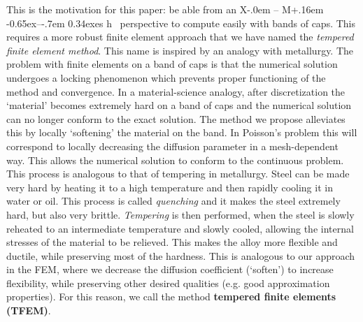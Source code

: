 \documentclass{article}
\makeatletter
\newcommand\xm{%
  X\kern-.0em%
  --%
   \hbox{M}\kern+.16em%
   \raise-0.65ex\hbox{--}\kern-.7em%
  \raise0.34ex\hbox{es}%
  \hbox{{h}}%
\@}
\theoremstyle{remark}
\makeatother
\begin{document}
This is the motivation for this paper: 
be able from an \xm\  perspective
to compute easily with bands of caps.
This requires a more robust finite element approach that we have named 
the \emph{tempered finite element method}.
 This name is inspired by an analogy with metallurgy. The problem with finite elements on a band of caps is that the numerical solution undergoes a locking phenomenon which prevents proper functioning of the method and convergence. In a material-science analogy, after discretization the `material' becomes extremely hard on a band of caps and the numerical solution can no longer conform to the exact solution. The method we propose  alleviates this by locally `softening' the material on the band. In Poisson's problem this will correspond to locally decreasing the diffusion parameter in a mesh-dependent way. This allows the numerical solution to conform to the continuous problem. This process is analogous to that of tempering in metallurgy. Steel can be made very hard by heating it to a high temperature and then rapidly cooling it in water or oil. This process is called \emph{quenching} and it makes the steel extremely hard, but also very brittle. \emph{Tempering} is then performed, when the steel is slowly reheated to an intermediate temperature and slowly cooled, allowing the internal stresses of the material to be relieved. This makes the alloy more flexible and ductile, while preserving most of the hardness. This is analogous to our approach in the FEM, where we decrease the diffusion coefficient (`soften') to increase flexibility, while preserving other desired qualities (e.g. good approximation properties). For this reason, we call the method \textbf{tempered finite elements (TFEM)}.

\end{document}
